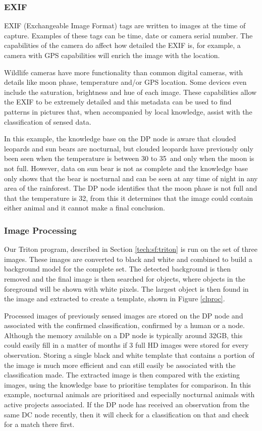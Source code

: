 		\subsubsection{EXIF}
			EXIF (Exchangeable Image Format) tags are written to images at the time of capture. Examples of these tags can be time, date or camera serial number. The capabilities of the camera do affect how detailed the EXIF is, for example, a camera with GPS capabilities will enrich the image with the location. 
			
			Wildlife cameras have more functionality than common digital cameras, with details like moon phase, temperature and/or GPS location. Some devices even include the saturation, brightness and hue of each image. These capabilities allow the EXIF to be extremely detailed and this metadata can be used to find patterns in pictures that, when accompanied by local knowledge, assist with the classification of sensed data. 
			
			In this example, the knowledge base on the DP node is aware that clouded leopards and sun bears are nocturnal, but clouded leopards have previously only been seen when the temperature is between 30 to 35\celsius\ and only when the moon is not full. However, data on sun bear is not as complete and the knowledge base only shows that the bear is nocturnal and can be seen at any time of night in any area of the rainforest. The DP node identifies that the moon phase is not full and that the temperature is 32\celsius, from this it determines that the image could contain either animal and it cannot make a final conclusion.
			
		\subsubsection{Image Processing}
			Our Triton program, described in Section \ref{tech:sf:triton} is run on the set of three images. These images are converted to black and white and combined to build a background model for the complete set. The detected background is then removed and the final image is then searched for objects, where objects in the foreground will be shown with white pixels. The largest object is then found in the image and extracted to create a template, shown in Figure \ref{clproc}.
			
			Processed images of previously sensed images are stored on the DP node and associated with the confirmed classification, confirmed by a human or a node. Although the memory available on a DP node is typically around 32GB, this could easily fill in a matter of months if 3 full HD images were stored for every observation. Storing a single black and white template that contains a portion of the image is much more efficient and can still easily be associated with the classification made. The extracted image is then compared with the existing images, using the knowledge base to prioritise templates for comparison. In this example, nocturnal animals are prioritised and especially nocturnal animals with active projects associated. If the DP node has received an observation from the same DC node recently, then it will check for a classification on that and check for a match there first.

